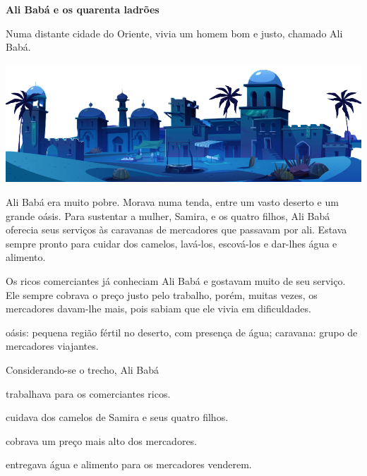 \begin{myquote}
\textbf{Ali Babá e os quarenta ladrões}

Numa distante cidade do Oriente, vivia um homem bom e justo, chamado Ali
Babá.

\begin{center}
\includegraphics[width=\textwidth]{./media/image23q.png}
\end{center}

Ali Babá era muito pobre. Morava numa tenda, entre um vasto deserto e um
grande oásis. Para sustentar a mulher, Samira, e os quatro filhos, Ali
Babá oferecia seus serviços às caravanas de mercadores que passavam por
ali. Estava sempre pronto para cuidar dos camelos, lavá-los, escová-los
e dar-lhes água e alimento.

Os ricos comerciantes já conheciam Ali Babá e gostavam muito de seu
serviço. Ele sempre cobrava o preço justo pelo trabalho, porém, muitas
vezes, os mercadores davam-lhe mais, pois sabiam que ele vivia em
dificuldades.


\begin{small}
 oásis: pequena região fértil no deserto, com presença de água; 
caravana: grupo de mercadores viajantes.
\end{small}
\end{myquote}

Considerando-se o trecho, Ali Babá\enlargethispage{3\baselineskip}

\begin{escolha}
\item trabalhava para os comerciantes ricos.

\item cuidava dos camelos de Samira e seus quatro filhos.

\item cobrava um preço mais alto dos mercadores.

\item entregava água e alimento para os mercadores venderem.
\end{escolha}

